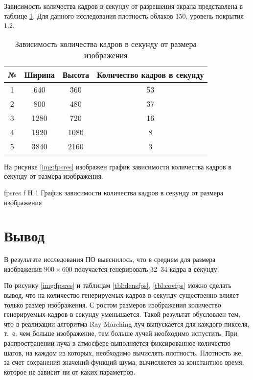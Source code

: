Зависимость количества кадров в секунду от разрешения экрана представлена в таблице \ref{tbl:resfps}. Для данного исследования плотность облаков 150, уровень покрытия $1.2$.

\begin{table}[H]
	\begin{center}
		\begin{threeparttable}
			\captionsetup{justification=raggedright,singlelinecheck=off}
			\caption{Зависимость количества кадров в секунду от размера изображения}
			\label{tbl:resfps}
			\begin{tabular}{|c|c|c|c|}
				\hline
				№ & Ширина & Высота & Количество кадров в секунду \\
				\hline
				1 & 640 & 360 & 53 \\
				\hline
				2 & 800 & 480 & 37 \\
				\hline
				3 & 1280 & 720 & 16 \\
				\hline
				4 & 1920 & 1080 & 8 \\
				\hline
				5 & 3840 & 2160 & 3 \\
				\hline
			\end{tabular}
		\end{threeparttable}
	\end{center}
\end{table}

На рисунке \ref{img:fpsres} изображен график зависимости количества кадров в секунду от размера изображения.

{fpsres} %
{f} %
{H} %
{1\textwidth} %
{График зависимости количества кадров в секунду от размера изображения} %

\section*{Вывод}

В результате исследования ПО выяснилось, что в среднем для размера изображения $900 \times 600$ получается генерировать 32--34 кадра в секунду.

По рисунку \ref{img:fpsres} и таблицам \ref{tbl:densfps}, \ref{tbl:covfps} можно сделать вывод, что на количество генерируемых кадров в секунду существенно влияет только размер изображения. С ростом размеров изображения количество генерируемых кадров в секунду уменьшается. Такой результат обусловлен тем, что в реализации алгоритма Ray Marching луч выпускается для каждого пикселя, т.~е. чем больше изображение, тем больше лучей необходимо испустить. При распространении луча в атмосфере выполняется фиксированное количество шагов, на каждом из которых, необходимо вычислять плотность. Плотность же, за счет сохранения значений функций шума, вычисляется за константное время, которое не зависит ни от каких параметров.